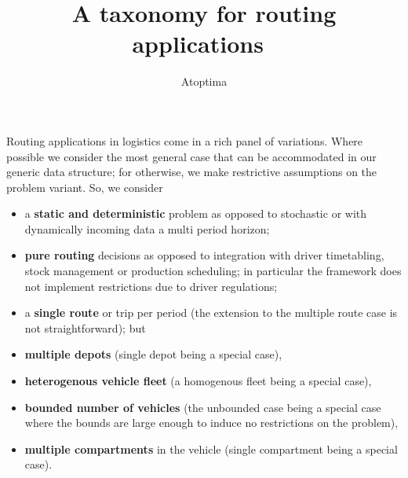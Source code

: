 \documentclass[12pt,a4paper]{article}
\title{A taxonomy for routing applications}
\author{Atoptima}
\begin{document}
\maketitle

Routing applications in logistics come in a rich panel of variations. Where possible we consider the most general case that can be accommodated in our generic data structure; for otherwise, we make restrictive assumptions on the problem variant. So, we consider
\begin{itemize}
\item a {\bf static and deterministic} problem as opposed to stochastic or with dynamically incoming data a multi period horizon;
\item {\bf pure routing} decisions as opposed to integration with driver timetabling, stock management or production scheduling; in particular the framework does not implement restrictions due to driver regulations;
\item a {\bf single route} or trip per period (the extension to the multiple route case is not straightforward);  but
\item {\bf multiple depots} (single depot being a special case),
\item {\bf heterogenous vehicle fleet} (a homogenous fleet being a special case),
\item {\bf bounded number of vehicles} (the unbounded case  being  a special case where the bounds are large enough to induce no restrictions on the problem),
\item {\bf multiple compartments} in the vehicle (single compartment being a special case).

\end{itemize}
\end{document}
